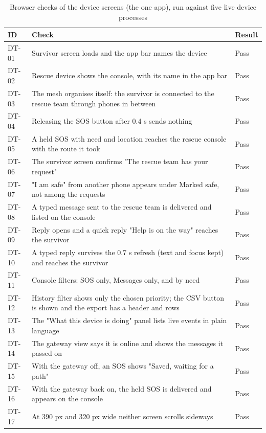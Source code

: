 \begin{table}[!htbp]
\caption{Browser checks of the device screens (the one app), run against five live device processes}
\label{tab:devwalk}
\scriptsize
\begin{tabularx}{\textwidth}{@{}p{1.0cm}X p{1.3cm}@{}}
\toprule
\textbf{ID} & \textbf{Check} & \textbf{Result}\\ \midrule
DT-01 & Survivor screen loads and the app bar names the device & Pass \\
DT-02 & Rescue device shows the console, with its name in the app bar & Pass \\
DT-03 & The mesh organises itself: the survivor is connected to the rescue team through phones in between & Pass \\
DT-04 & Releasing the SOS button after 0.4 s sends nothing & Pass \\
DT-05 & A held SOS with need and location reaches the rescue console with the route it took & Pass \\
DT-06 & The survivor screen confirms "The rescue team has your request" & Pass \\
DT-07 & "I am safe" from another phone appears under Marked safe, not among the requests & Pass \\
DT-08 & A typed message sent to the rescue team is delivered and listed on the console & Pass \\
DT-09 & Reply opens and a quick reply "Help is on the way" reaches the survivor & Pass \\
DT-10 & A typed reply survives the 0.7 s refresh (text and focus kept) and reaches the survivor & Pass \\
DT-11 & Console filters: SOS only, Messages only, and by need & Pass \\
DT-12 & History filter shows only the chosen priority; the CSV button is shown and the export has a header and rows & Pass \\
DT-13 & The "What this device is doing" panel lists live events in plain language & Pass \\
DT-14 & The gateway view says it is online and shows the messages it passed on & Pass \\
DT-15 & With the gateway off, an SOS shows "Saved, waiting for a path" & Pass \\
DT-16 & With the gateway back on, the held SOS is delivered and appears on the console & Pass \\
DT-17 & At 390 px and 320 px wide neither screen scrolls sideways & Pass \\

\end{tabularx}
\end{table}
